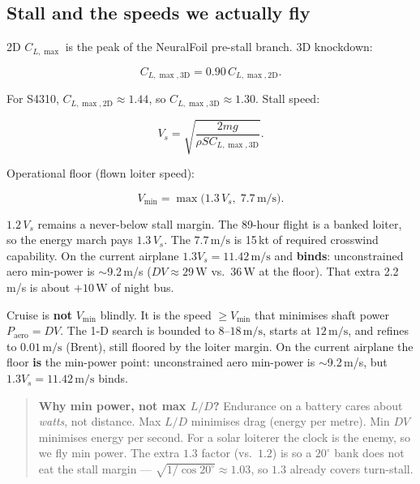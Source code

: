\documentclass[11pt,letterpaper]{article}
\newenvironment{intuition}{\begin{quote}\small}{\end{quote}}
\begin{document}
\subsection{Stall and the speeds we actually fly}

2D $C_{L,\max}$ is the peak of the NeuralFoil pre-stall branch. 3D knockdown:

\begin{equation}
  C_{L,\max,3\mathrm{D}} = 0.90\, C_{L,\max,2\mathrm{D}}.
\end{equation}

For S4310, $C_{L,\max,2\mathrm{D}} \approx 1.44$, so $C_{L,\max,3\mathrm{D}} \approx 1.30$. Stall speed:

\begin{equation}
  V_s = \sqrt{\frac{2mg}{\rho S C_{L,\max,3\mathrm{D}}}}.
\end{equation}

Operational floor (flown loiter speed):

\begin{equation}
  V_{\min} = \max\bigl(1.3\, V_s,\; 7.7\,\mathrm{m/s}\bigr).
\end{equation}

$1.2\,V_s$ remains a never-below stall margin. The 89-hour flight is a banked loiter, so the energy march pays $1.3\,V_s$. The $7.7\,\mathrm{m/s}$ is 15\,kt of required crosswind capability. On the current airplane $1.3 V_s = 11.42\,\mathrm{m/s}$ and \textbf{binds}: unconstrained aero min-power is $\sim$9.2\,m/s ($DV \approx 29\,\mathrm{W}$ vs.\ $36\,\mathrm{W}$ at the floor). That extra 2.2\,m/s is about $+10\,\mathrm{W}$ of night bus.

Cruise is \textbf{not} $V_{\min}$ blindly. It is the speed $\ge V_{\min}$ that minimises shaft power $P_\mathrm{aero} = D V$. The 1-D search is bounded to $8$--$18\,\mathrm{m/s}$, starts at $12\,\mathrm{m/s}$, and refines to $0.01\,\mathrm{m/s}$ (Brent), still floored by the loiter margin. On the current airplane the floor \textbf{is} the min-power point: unconstrained aero min-power is $\sim$9.2\,m/s, but $1.3 V_s = 11.42\,\mathrm{m/s}$ binds.

\begin{intuition}
\textbf{Why min power, not max $L/D$?} Endurance on a battery cares about \emph{watts}, not distance. Max $L/D$ minimises drag (energy per metre). Min $D V$ minimises energy per second. For a solar loiterer the clock is the enemy, so we fly min power. The extra $1.3$ factor (vs.\ $1.2$) is so a $20^\circ$ bank does not eat the stall margin --- $\sqrt{1/\cos 20^\circ}\approx 1.03$, so $1.3$ already covers turn-stall.
\end{intuition}
\end{document}
